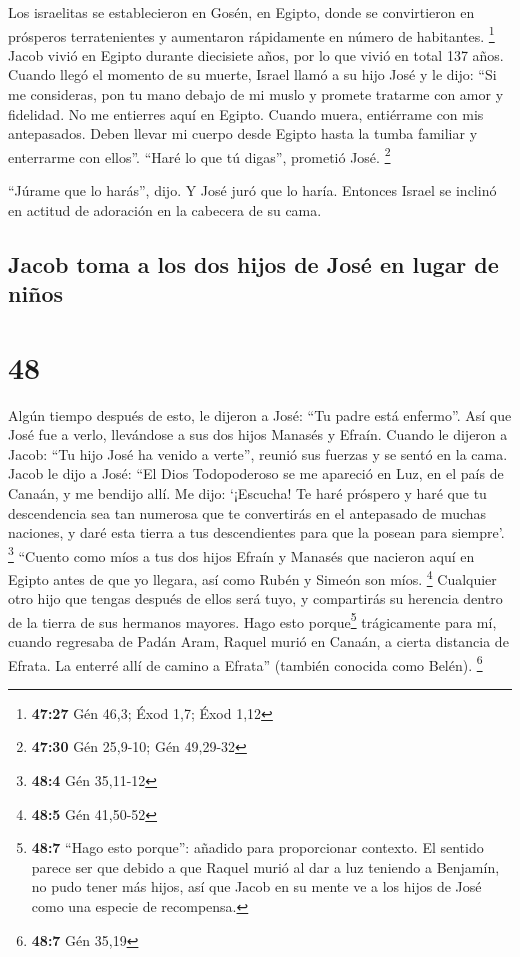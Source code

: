  Los israelitas se establecieron en Gosén, en Egipto,
donde se convirtieron en prósperos terratenientes y aumentaron
rápidamente en número de habitantes. \footnote{\textbf{47:27} Gén 46,3;
  Éxod 1,7; Éxod 1,12}  Jacob vivió en Egipto durante
diecisiete años, por lo que vivió en total 137 años. 
Cuando llegó el momento de su muerte, Israel llamó a su hijo José y le
dijo: ``Si me consideras, pon tu mano debajo de mi muslo y promete
tratarme con amor y fidelidad. No me entierres aquí en Egipto.
 Cuando muera, entiérrame con mis antepasados. Deben
llevar mi cuerpo desde Egipto hasta la tumba familiar y enterrarme con
ellos''. ``Haré lo que tú digas'', prometió José. \footnote{\textbf{47:30}
  Gén 25,9-10; Gén 49,29-32}

 ``Júrame que lo harás'', dijo. Y José juró que lo haría.
Entonces Israel se inclinó en actitud de adoración en la cabecera de su
cama.

\hypertarget{jacob-toma-a-los-dos-hijos-de-josuxe9-en-lugar-de-niuxf1os}{%
\subsection{Jacob toma a los dos hijos de José en lugar de
niños}\label{jacob-toma-a-los-dos-hijos-de-josuxe9-en-lugar-de-niuxf1os}}

\hypertarget{section-47}{%
\section{48}\label{section-47}}

 Algún tiempo después de esto, le dijeron a José: ``Tu
padre está enfermo''. Así que José fue a verlo, llevándose a sus dos
hijos Manasés y Efraín.  Cuando le dijeron a Jacob: ``Tu
hijo José ha venido a verte'', reunió sus fuerzas y se sentó en la cama.
 Jacob le dijo a José: ``El Dios Todopoderoso se me
apareció en Luz, en el país de Canaán, y me bendijo allí. 
Me dijo: `¡Escucha! Te haré próspero y haré que tu descendencia sea tan
numerosa que te convertirás en el antepasado de muchas naciones, y daré
esta tierra a tus descendientes para que la posean para siempre'.
\footnote{\textbf{48:4} Gén 35,11-12}  ``Cuento como míos
a tus dos hijos Efraín y Manasés que nacieron aquí en Egipto antes de
que yo llegara, así como Rubén y Simeón son míos. \footnote{\textbf{48:5}
  Gén 41,50-52}  Cualquier otro hijo que tengas después de
ellos será tuyo, y compartirás su herencia dentro de la tierra de sus
hermanos mayores.  Hago esto porque\footnote{\textbf{48:7}
  ``Hago esto porque'': añadido para proporcionar contexto. El sentido
  parece ser que debido a que Raquel murió al dar a luz teniendo a
  Benjamín, no pudo tener más hijos, así que Jacob en su mente ve a los
  hijos de José como una especie de recompensa.} trágicamente para mí,
cuando regresaba de Padán Aram, Raquel murió en Canaán, a cierta
distancia de Efrata. La enterré allí de camino a Efrata'' (también
conocida como Belén). \footnote{\textbf{48:7} Gén 35,19}

